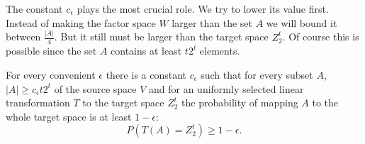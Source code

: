 The constant $c_\epsilon$ plays the most crucial role. We try to lower its value first. Instead of making the factor space $W$ larger than the set $A$ we will bound it between $\frac{|A|}{4}$. But it still must be larger than the target space $Z_2^t$. Of course this is possible since the set $A$ contains at least $t2^t$ elements.

\begin{remark}
For every convenient $\epsilon$ there is a constant $c_\epsilon$ such that for every subset $A$, $|A| \geq c_\epsilon t 2^t$ of the source space $V$ and for an uniformly selected linear transformation $T$ to the target space $Z_2^t$ the probability of mapping $A$ to the whole target space is at least $1-\epsilon$:
\begin{displaymath}
P(T(A) = Z_2^t) \geq 1 - \epsilon \textit{.}
\end{displaymath}
\end{remark}

